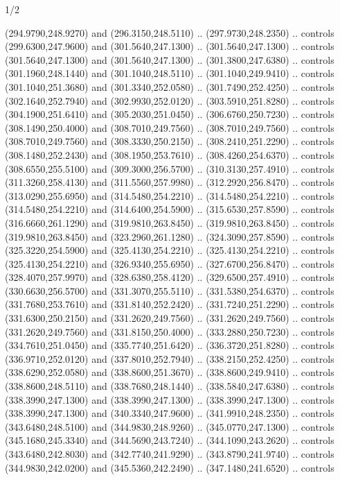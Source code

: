 \begin{flagdescription}{1/2}
\begin{scope}[xshift=0.5\flaglength]
\begin{scope}[scale=0.004\flagwidth,xshift=-90mm,yshift=89mm]
\begin{scope}[y=0.80pt, x=0.80pt, yscale=-1, xscale=1, inner sep=0pt, outer sep=0pt]
  (294.9790,248.9270) and (296.3150,248.5110) .. (297.9730,248.2350) .. controls
  (299.6300,247.9600) and (301.5640,247.1300) .. (301.5640,247.1300) .. controls
  (301.5640,247.1300) and (301.5640,247.1300) .. (301.3800,247.6380) .. controls
  (301.1960,248.1440) and (301.1040,248.5110) .. (301.1040,249.9410) .. controls
  (301.1040,251.3680) and (301.3340,252.0580) .. (301.7490,252.4250) .. controls
  (302.1640,252.7940) and (302.9930,252.0120) .. (303.5910,251.8280) .. controls
  (304.1900,251.6410) and (305.2030,251.0450) .. (306.6760,250.7230) .. controls
  (308.1490,250.4000) and (308.7010,249.7560) .. (308.7010,249.7560) .. controls
  (308.7010,249.7560) and (308.3330,250.2150) .. (308.2410,251.2290) .. controls
  (308.1480,252.2430) and (308.1950,253.7610) .. (308.4260,254.6370) .. controls
  (308.6550,255.5100) and (309.3000,256.5700) .. (310.3130,257.4910) .. controls
  (311.3260,258.4130) and (311.5560,257.9980) .. (312.2920,256.8470) .. controls
  (313.0290,255.6950) and (314.5480,254.2210) .. (314.5480,254.2210) .. controls
  (314.5480,254.2210) and (314.6400,254.5900) .. (315.6530,257.8590) .. controls
  (316.6660,261.1290) and (319.9810,263.8450) .. (319.9810,263.8450) .. controls
  (319.9810,263.8450) and (323.2960,261.1280) .. (324.3090,257.8590) .. controls
  (325.3220,254.5900) and (325.4130,254.2210) .. (325.4130,254.2210) .. controls
  (325.4130,254.2210) and (326.9340,255.6950) .. (327.6700,256.8470) .. controls
  (328.4070,257.9970) and (328.6380,258.4120) .. (329.6500,257.4910) .. controls
  (330.6630,256.5700) and (331.3070,255.5110) .. (331.5380,254.6370) .. controls
  (331.7680,253.7610) and (331.8140,252.2420) .. (331.7240,251.2290) .. controls
  (331.6300,250.2150) and (331.2620,249.7560) .. (331.2620,249.7560) .. controls
  (331.2620,249.7560) and (331.8150,250.4000) .. (333.2880,250.7230) .. controls
  (334.7610,251.0450) and (335.7740,251.6420) .. (336.3720,251.8280) .. controls
  (336.9710,252.0120) and (337.8010,252.7940) .. (338.2150,252.4250) .. controls
  (338.6290,252.0580) and (338.8600,251.3670) .. (338.8600,249.9410) .. controls
  (338.8600,248.5110) and (338.7680,248.1440) .. (338.5840,247.6380) .. controls
  (338.3990,247.1300) and (338.3990,247.1300) .. (338.3990,247.1300) .. controls
  (338.3990,247.1300) and (340.3340,247.9600) .. (341.9910,248.2350) .. controls
  (343.6480,248.5100) and (344.9830,248.9260) .. (345.0770,247.1300) .. controls
  (345.1680,245.3340) and (344.5690,243.7240) .. (344.1090,243.2620) .. controls
  (343.6480,242.8030) and (342.7740,241.9290) .. (343.8790,241.9740) .. controls
  (344.9830,242.0200) and (345.5360,242.2490) .. (347.1480,241.6520) .. controls

\end{scope}
\end{scope}
\end{scope}
\end{flagdescription}
